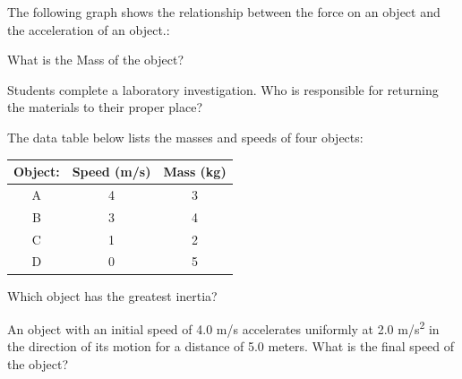 \documentclass[10pt]{examdesign}
\begin{document}
\begin{multiplechoice} [title={Multiple Choice},
	rearrange=yes]
\begin{question}
	The following graph shows the relationship between the force on an object and the acceleration of an object.:
	
	
	What is the Mass of the object?

	
\end{question}

\begin{question}
	Students complete a laboratory investigation.  Who is responsible for returning the materials to their proper place?

	\end{question}




\begin{question}
The data table below lists the masses and speeds of four objects:


\begin{center}
	\begin{tabular}{ | c | c | c | }
	\hline
		Object: & Speed (m/s) & Mass (kg) \\ 
		\hline
		A & 4 & 3 \\  
		\hline
		B & 3 & 4    \\
		\hline
		C & 1 & 2    \\
		\hline
		D & 0 & 5    \\
		\hline
	\end{tabular}
\end{center}

Which object has the greatest inertia?


\end{question}




\begin{question}
An object with an initial speed of 4.0 m/s accelerates uniformly at 2.0 m/s\textsuperscript{2} in the direction of its motion for a distance of 5.0 meters. What is the
final speed of the object? 


\end{question}
\end{multiplechoice}
\end{document}
